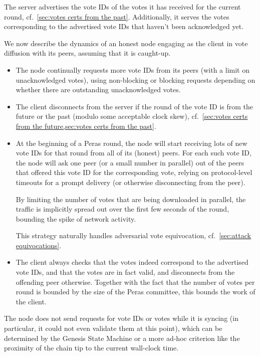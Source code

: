 The server advertises the vote IDs of the votes it has received for the current round, cf.~\cref{sec:votes certs from the past}.
Additionally, it serves the votes corresponding to the advertised vote IDs that haven't been acknowledged yet.

We now describe the dynamics of an honest node engaging as the client in vote diffusion with its peers, assuming that it is caught-up.
\begin{itemize}
\item
  The node continually requests more vote IDs from its peers (with a limit on unacknowledged votes), using non-blocking or blocking requests depending on whether there are outstanding unacknowledged votes.
\item
  The client disconnects from the server if the round of the vote ID is from the future or the past (modulo some acceptable clock skew), cf.~\cref{sec:votes certs from the future,sec:votes certs from the past}. %
\item
  At the beginning of a Peras round, the node will start receiving lots of new vote IDs for that round from all of its (honest) peers.
  For each such vote ID, the node will ask one peer (or a small number in parallel) out of the peers that offered this vote ID for the corresponding vote, relying on protocol-level timeouts for a prompt delivery (or otherwise disconnecting from the peer).

  By limiting the number of votes that are being downloaded in parallel, the traffic is implicitly spread out over the first few seconds of the round, bounding the spike of network activity.

  This strategy naturally handles adversarial vote equivocation, cf.~\cref{sec:attack equivocations}.
\item
  The client always checks that the votes indeed correspond to the advertised vote IDs, and that the votes are in fact valid, and disconnects from the offending peer otherwise.
  Together with the fact that the number of votes per round is bounded by the size of the Peras committee, this bounds the work of the client.
\end{itemize}
The node does not send requests for vote IDs or votes while it is syncing (in particular, it could not even validate them at this point), which can be determined by the Genesis State Machine \parencite{genesis-implementation-documentation} or a more ad-hoc criterion like the proximity of the chain tip to the current wall-clock time. %

